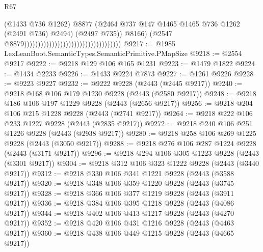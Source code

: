 \begin{lexlean}{R67}
\begin{coremodule}
                                                                            (@1433 @736 @1262)
                                                                            @8877
                                                                            (@2464
                                                                              @737
                                                                              @147
                                                                              @1465
                                                                              @1465
                                                                              @736
                                                                              @1262
                                                                              (@2491 @736)
                                                                              @2494)
                                                                            (@2497 @735))
                                                                          @8166)
                                                                        (@2547
                                                                          @8879)))))))))))))))))))))))))))))))))))
@9217 := @1985 LexLeanBoot.SemanticTypes.SemanticPrimitive.PMapSize
@9218 := @2554 @9217
@9222 := @9218 @129 @106 @165 @1231
@9223 := @1479 @1822
@9224 := @1434 @2233
@9226 := @1433 @9224 @7873
@9227 := @1261 @9226
@9228 := @9223 @9227
@9232 := @9222 @9228 (@2443 (@2445 @9217))
@9240 := @9218 @168 @106 @179 @1230 @9228 (@2443 (@2580 @9217))
@9248 := @9218 @186 @106 @197 @1229 @9228 (@2443 (@2656 @9217))
@9256 := @9218 @204 @106 @215 @1228 @9228 (@2443 (@2741 @9217))
@9264 := @9218 @222 @106 @233 @1227 @9228 (@2443 (@2835 @9217))
@9272 := @9218 @240 @106 @251 @1226 @9228 (@2443 (@2938 @9217))
@9280 := @9218 @258 @106 @269 @1225 @9228 (@2443 (@3050 @9217))
@9288 := @9218 @276 @106 @287 @1224 @9228 (@2443 (@3171 @9217))
@9296 := @9218 @294 @106 @305 @1223 @9228 (@2443 (@3301 @9217))
@9304 := @9218 @312 @106 @323 @1222 @9228 (@2443 (@3440 @9217))
@9312 := @9218 @330 @106 @341 @1221 @9228 (@2443 (@3588 @9217))
@9320 := @9218 @348 @106 @359 @1220 @9228 (@2443 (@3745 @9217))
@9328 := @9218 @366 @106 @377 @1219 @9228 (@2443 (@3911 @9217))
@9336 := @9218 @384 @106 @395 @1218 @9228 (@2443 (@4086 @9217))
@9344 := @9218 @402 @106 @413 @1217 @9228 (@2443 (@4270 @9217))
@9352 := @9218 @420 @106 @431 @1216 @9228 (@2443 (@4463 @9217))
@9360 := @9218 @438 @106 @449 @1215 @9228 (@2443 (@4665 @9217))

\end{coremodule}
\end{lexlean}
